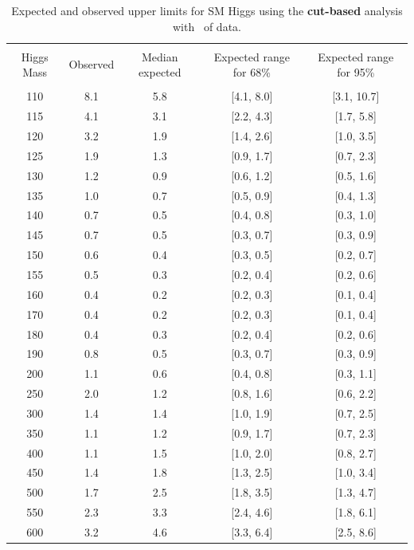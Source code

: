 \begin{table}[hbp!]
\begin{center}
\begin{tabular}{c c c c c}
\hline
\vspace{-3mm} && \\
 Higgs Mass & Observed  & Median expected & Expected range for 68\% & Expected range for 95\%   \\
\vspace{-3mm} && \\
\hline
110 & 8.1 & 5.8 & [4.1, 8.0] & [3.1, 10.7] \\
115 & 4.1 & 3.1 & [2.2, 4.3] & [1.7, 5.8] \\
120 & 3.2 & 1.9 & [1.4, 2.6] & [1.0, 3.5] \\
125 & 1.9 & 1.3 & [0.9, 1.7] & [0.7, 2.3] \\
130 & 1.2 & 0.9 & [0.6, 1.2] & [0.5, 1.6] \\
135 & 1.0 & 0.7 & [0.5, 0.9] & [0.4, 1.3] \\
140 & 0.7 & 0.5 & [0.4, 0.8] & [0.3, 1.0] \\
145 & 0.7 & 0.5 & [0.3, 0.7] & [0.3, 0.9] \\
150 & 0.6 & 0.4 & [0.3, 0.5] & [0.2, 0.7] \\
155 & 0.5 & 0.3 & [0.2, 0.4] & [0.2, 0.6] \\
160 & 0.4 & 0.2 & [0.2, 0.3] & [0.1, 0.4] \\
170 & 0.4 & 0.2 & [0.2, 0.3] & [0.1, 0.4] \\
180 & 0.4 & 0.3 & [0.2, 0.4] & [0.2, 0.6] \\
190 & 0.8 & 0.5 & [0.3, 0.7] & [0.3, 0.9] \\
200 & 1.1 & 0.6 & [0.4, 0.8] & [0.3, 1.1] \\
250 & 2.0 & 1.2 & [0.8, 1.6] & [0.6, 2.2] \\
300 & 1.4 & 1.4 & [1.0, 1.9] & [0.7, 2.5] \\
350 & 1.1 & 1.2 & [0.9, 1.7] & [0.7, 2.3] \\
400 & 1.1 & 1.5 & [1.0, 2.0] & [0.8, 2.7] \\
450 & 1.4 & 1.8 & [1.3, 2.5] & [1.0, 3.4] \\
500 & 1.7 & 2.5 & [1.8, 3.5] & [1.3, 4.7] \\
550 & 2.3 & 3.3 & [2.4, 4.6] & [1.8, 6.1] \\
600 & 3.2 & 4.6 & [3.3, 6.4] & [2.5, 8.6] \\
\hline
\end{tabular}
\caption{Expected and observed upper limits for SM Higgs using the
  {\bf cut-based} analysis with \intlumiEightTeV\ of data.}
\label{tab:cutbase_uls}
\end{center}
\end{table}

